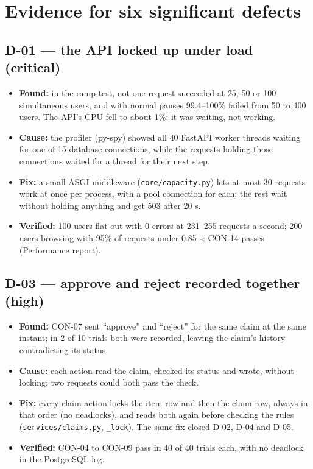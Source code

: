 \section{Evidence for six significant defects}

\subsection{D-01 — the API locked up under load (critical)}

\begin{itemize}
\item \textbf{Found:} in the ramp test, not one request succeeded at 25, 50 or 100 simultaneous users, and with normal pauses 99.4–100\% failed from 50 to 400 users. The API’s CPU fell to about 1\%: it was waiting, not working.
\item \textbf{Cause:} the profiler (py-spy) showed all 40 FastAPI worker threads waiting for one of 15 database connections, while the requests holding those connections waited for a thread for their next step.
\item \textbf{Fix:} a small ASGI middleware (\texttt{core/\allowbreak{}capacity.\allowbreak{}py}) lets at most 30 requests work at once per process, with a pool connection for each; the rest wait without holding anything and get 503 after 20 s.
\item \textbf{Verified:} 100 users flat out with 0 errors at 231–255 requests a second; 200 users browsing with 95\% of requests under 0.85 s; CON-14 passes (Performance report).
\end{itemize}

\subsection{D-03 — approve and reject recorded together (high)}

\begin{itemize}
\item \textbf{Found:} CON-07 sent “approve” and “reject” for the same claim at the same instant; in 2 of 10 trials both were recorded, leaving the claim’s history contradicting its status.
\item \textbf{Cause:} each action read the claim, checked its status and wrote, without locking; two requests could both pass the check.
\item \textbf{Fix:} every claim action locks the item row and then the claim row, always in that order (no deadlocks), and reads both again before checking the rules (\texttt{services/\allowbreak{}claims.\allowbreak{}py}, \texttt{\_\allowbreak{}lock}). The same fix closed D-02, D-04 and D-05.
\item \textbf{Verified:} CON-04 to CON-09 pass in 40 of 40 trials each, with no deadlock in the PostgreSQL log.
\end{itemize}

